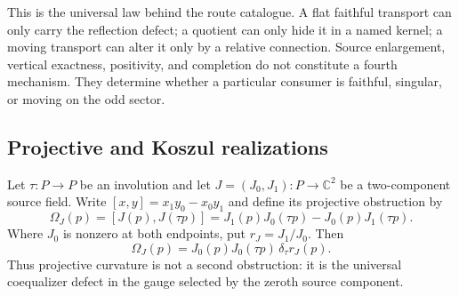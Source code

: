 \documentclass[11pt]{article}
\theoremstyle{definition}
\theoremstyle{remark}
\newcommand{\C}{\mathbb C}
\begin{document}
This is the universal law behind the route catalogue.  A flat faithful
transport can only carry the reflection defect; a quotient can only hide it
in a named kernel; a moving transport can alter it only by a relative
connection.  Source enlargement, vertical exactness, positivity, and
completion do not constitute a fourth mechanism.  They determine whether a
particular consumer is faithful, singular, or moving on the odd sector.

\subsection{Projective and Koszul realizations}

Let \(\tau:P\to P\) be an involution and let
\(J=(J_0,J_1):P\to\C^2\) be a two-component source field.  Write
\([x,y]=x_1y_0-x_0y_1\) and define its projective obstruction by
\[
              \Omega_J(p)=[J(p),J(\tau p)]
              =J_1(p)J_0(\tau p)-J_0(p)J_1(\tau p).
\tag{4.17P}\label{eq:projective-wedge}
\]
Where \(J_0\) is nonzero at both endpoints, put \(r_J=J_1/J_0\).  Then
\[
            \Omega_J(p)=J_0(p)J_0(\tau p)\,
                         \delta_\tau r_J(p).
\tag{4.17P1}\label{eq:projective-wedge-as-descent-defect}
\]
Thus projective curvature is not a second obstruction: it is the universal
coequalizer defect in the gauge selected by the zeroth source component.
\end{document}
